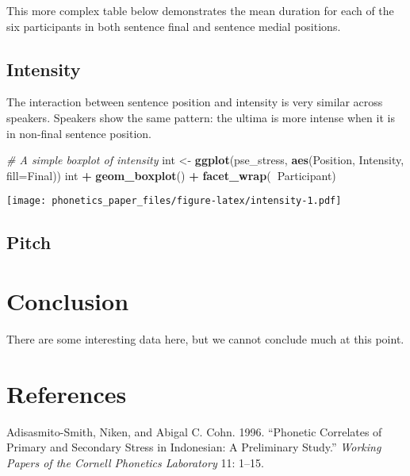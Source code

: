 \documentclass[]{article}
\newenvironment{Shaded}{\begin{snugshade}}{\end{snugshade}}
\newcommand{\KeywordTok}[1]{\textcolor[rgb]{0.13,0.29,0.53}{\textbf{#1}}}
\newcommand{\DataTypeTok}[1]{\textcolor[rgb]{0.13,0.29,0.53}{#1}}
\newcommand{\StringTok}[1]{\textcolor[rgb]{0.31,0.60,0.02}{#1}}
\newcommand{\CommentTok}[1]{\textcolor[rgb]{0.56,0.35,0.01}{\textit{#1}}}
\newcommand{\OperatorTok}[1]{\textcolor[rgb]{0.81,0.36,0.00}{\textbf{#1}}}
\newcommand{\NormalTok}[1]{#1}
\begin{document}
This more complex table below demonstrates the mean duration for each of
the six participants in both sentence final and sentence medial
positions.

\subsection{Intensity}\label{intensity}

The interaction between sentence position and intensity is very similar
across speakers. Speakers show the same pattern: the ultima is more
intense when it is in non-final sentence position.

\begin{Shaded}
\begin{Highlighting}[]
\CommentTok{# A simple boxplot of intensity}
\NormalTok{int <-}\StringTok{ }\KeywordTok{ggplot}\NormalTok{(pse_stress, }\KeywordTok{aes}\NormalTok{(Position, Intensity, }\DataTypeTok{fill=}\NormalTok{Final))}
\NormalTok{int }\OperatorTok{+}\StringTok{ }\KeywordTok{geom_boxplot}\NormalTok{() }\OperatorTok{+}\StringTok{ }\KeywordTok{facet_wrap}\NormalTok{(}\OperatorTok{~}\NormalTok{Participant)}
\end{Highlighting}
\end{Shaded}

\texttt{[image: phonetics\_paper\_files/figure-latex/intensity-1.pdf]}

\subsection{Pitch}\label{pitch}

\section{Conclusion}\label{conclusion}

There are some interesting data here, but we cannot conclude much at
this point.

\section*{References}\label{references}

\hypertarget{refs}{}
\hypertarget{ref-adisasmito1996phonetic}{}
Adisasmito-Smith, Niken, and Abigal C. Cohn. 1996. ``Phonetic Correlates
of Primary and Secondary Stress in Indonesian: A Preliminary Study.''
\emph{Working Papers of the Cornell Phonetics Laboratory} 11: 1--15.
\end{document}
